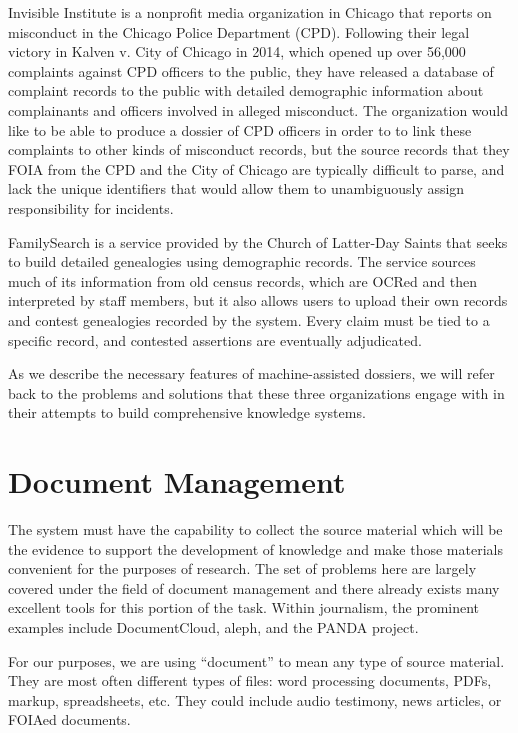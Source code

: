 \documentclass[format=siggraph, review=true]{acmart}
\begin{document}
Invisible Institute is a nonprofit media organization in Chicago that
reports on misconduct in the Chicago Police Department (CPD). Following
their legal victory in Kalven v. City of Chicago in 2014, which opened
up over 56,000 complaints against CPD officers to the public, they have
released a database of complaint records to the public with detailed
demographic information about complainants and officers involved in
alleged misconduct. The organization would like to be able to produce
a dossier of CPD officers in order to to link these complaints to other
kinds of misconduct records, but the source records that they FOIA from
the CPD and the City of Chicago are typically difficult to parse, and
lack the unique identifiers that would allow them to unambiguously
assign responsibility for incidents.

FamilySearch is a service provided by the Church of Latter-Day Saints
that seeks to build detailed genealogies using demographic records.
The service sources much of its information from old census records,
which are OCRed and then interpreted by staff members, but it also allows
users to upload their own records and contest genealogies recorded by the
system. Every claim must be tied to a specific record, and contested
assertions are eventually adjudicated.

As we describe the necessary features of machine-assisted dossiers, we will
refer back to the problems and solutions that these three organizations
engage with in their attempts to build comprehensive knowledge systems.

\section{Document Management}
The system must have the capability to collect the source material
which will be the evidence to support the development of
knowledge and make those materials convenient for the purposes of
research. The set of problems here are largely covered under the field
of document management and there already exists many excellent tools
for this portion of the task. Within journalism, the prominent
examples include DocumentCloud, aleph, and the PANDA project.

For our purposes, we are using ``document'' to mean any type of source
material. They are most often different types of files: word
processing documents, PDFs, markup, spreadsheets, etc. They could
include audio testimony, news articles, or FOIAed documents.
\end{document}
